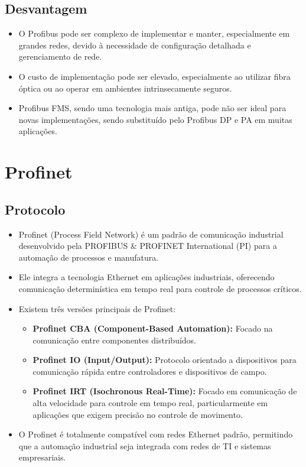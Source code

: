 \documentclass[a4paper,11pt]{article} %
\begin{document}
\subsection{Desvantagem}
\begin{itemize}
    \item O Profibus pode ser complexo de implementar e manter, especialmente em grandes redes, devido à necessidade de configuração detalhada e gerenciamento de rede.
    \item O custo de implementação pode ser elevado, especialmente ao utilizar fibra óptica ou ao operar em ambientes intrinsecamente seguros.
    \item Profibus FMS, sendo uma tecnologia mais antiga, pode não ser ideal para novas implementações, sendo substituído pelo Profibus DP e PA em muitas aplicações.
\end{itemize}


\section{Profinet}

\subsection{Protocolo}
\begin{itemize}
    \item Profinet (Process Field Network) é um padrão de comunicação industrial desenvolvido pela PROFIBUS \& PROFINET International (PI) para a automação de processos e manufatura. 
    \item Ele integra a tecnologia Ethernet em aplicações industriais, oferecendo comunicação determinística em tempo real para controle de processos críticos.
    \item Existem três versões principais de Profinet:
    \begin{itemize}
        \item \textbf{Profinet CBA (Component-Based Automation):} Focado na comunicação entre componentes distribuídos.
        \item \textbf{Profinet IO (Input/Output):} Protocolo orientado a dispositivos para comunicação rápida entre controladores e dispositivos de campo.
        \item \textbf{Profinet IRT (Isochronous Real-Time):} Focado em comunicação de alta velocidade para controle em tempo real, particularmente em aplicações que exigem precisão no controle de movimento.
    \end{itemize}
    \item O Profinet é totalmente compatível com redes Ethernet padrão, permitindo que a automação industrial seja integrada com redes de TI e sistemas empresariais.
\end{itemize}
\end{document}
